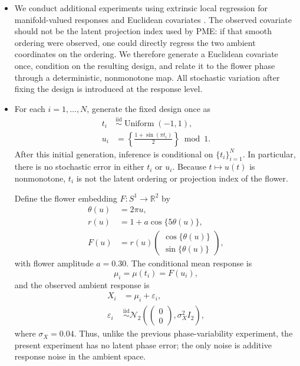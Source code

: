 \begin{itemize}
    \item We conduct additional experiments using extrinsic local regression
    for manifold-valued responses and Euclidean covariates
    \citep{linExtrinsicLocalRegression2017}. The observed covariate should not
    be the latent projection index used by PME: if that smooth ordering were
    observed, one could directly regress the two ambient coordinates on the
    ordering. We therefore generate a Euclidean covariate once, condition on
    the resulting design, and relate it to the flower phase through a
    deterministic, nonmonotone map. All stochastic variation after fixing the
    design is introduced at the response level.

    \item For each $i=1,\ldots,N$, generate the fixed design once as
    \begin{align}
        t_i &\overset{\mathrm{iid}}{\sim} \operatorname{Uniform}(-1,1),\\
        u_i &= \left\{\frac{1+\sin(\pi t_i)}{2}\right\}\bmod 1.
    \end{align}
    After this initial generation, inference is conditional on
    $\{t_i\}_{i=1}^N$. In particular, there is no stochastic error in either
    $t_i$ or $u_i$. Because $t\mapsto u(t)$ is nonmonotone, $t_i$ is not the
    latent ordering or projection index of the flower.

    Define the flower embedding $F:S^1\rightarrow\mathbb{R}^2$ by
    \begin{align}
        \theta(u) &= 2\pi u,\\
        r(u) &= 1+a\cos\{5\theta(u)\},\\
        F(u) &= r(u)
        \begin{pmatrix}
            \cos\{\theta(u)\}\\
            \sin\{\theta(u)\}
        \end{pmatrix},
    \end{align}
    with flower amplitude $a=0.30$. The conditional mean response is
    \[
        \mu_i=\mu(t_i)=F(u_i),
    \]
    and the observed ambient response is
    \begin{align}
        X_i &= \mu_i+\varepsilon_i,\\
        \varepsilon_i &\overset{\mathrm{iid}}{\sim}
        \mathcal{N}_2\!\left(
        \begin{pmatrix}0\\0\end{pmatrix},
        \sigma_X^2 I_2\right),
    \end{align}
    where $\sigma_X=0.04$. Thus, unlike the previous phase-variability
    experiment, the present experiment has no latent phase error; the only
    noise is additive response noise in the ambient space.


\end{itemize}
